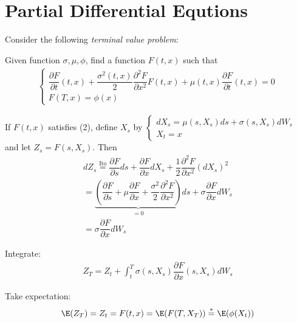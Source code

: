 \section{Partial Differential Equtions}
Consider the following \textit{terminal value problem}:\par
\noindent Given function $\sigma,\mu,\phi$, find a function $F(t,x)$ such that 
\begin{equation}
  \begin{gathered}
    \begin{cases}
      \dfrac{\partial F}{\partial t}(t,x)+\dfrac{\sigma^2(t,x)}{2}\dfrac{\partial^2 F}{\partial x^2}F(t,x)+\mu(t,x)\dfrac{\partial F}{\partial t}(t,x) = 0\\
      F(T,x) = \phi(x)
    \end{cases}
  \end{gathered}
\end{equation}\par
\noindent If $F(t,x)$ satisfies (2), define $X_s$ by $\begin{cases}
  dX_s = \mu(s,X_s)ds+\sigma(s,X_s)dW_s\\X_t=x
\end{cases}$ and let $Z_s = F(s,X_s)$. Then
\begin{equation*}
  \begin{gathered}
    dZ_s \stackrel{\text{Ito}}{=}\dfrac{\partial F}{\partial s}ds+\dfrac{\partial F}{\partial x}dX_s+\dfrac{1}{2}\dfrac{\partial^2 F}{\partial x^2}(dX_s)^2\\
    = \underbrace{\left(\dfrac{\partial F}{\partial s}+\mu\dfrac{\partial F}{\partial x}+\dfrac{\sigma^2}{2}\dfrac{\partial^2 F}{\partial x^2}\right)}_{=0}ds + \sigma\dfrac{\partial F}{\partial x}dW_s\\
    = \sigma\dfrac{\partial F}{\partial x}dW_s
  \end{gathered}
\end{equation*}\par
\noindent Integrate:
\begin{equation*}
  \begin{gathered}
    Z_T = Z_t + \int_{t}^{T}\sigma(s,X_s)\dfrac{\partial F}{\partial x}(s,X_s)dW_s
  \end{gathered}
\end{equation*}\par
\noindent Take expectation:
\begin{equation*}
  \begin{gathered}
    \E(Z_T) = Z_t = F(t,x) = \E(F(T,X_T)) \stackrel{*}{=} \E(\phi(X_t))
  \end{gathered}
\end{equation*}\par
